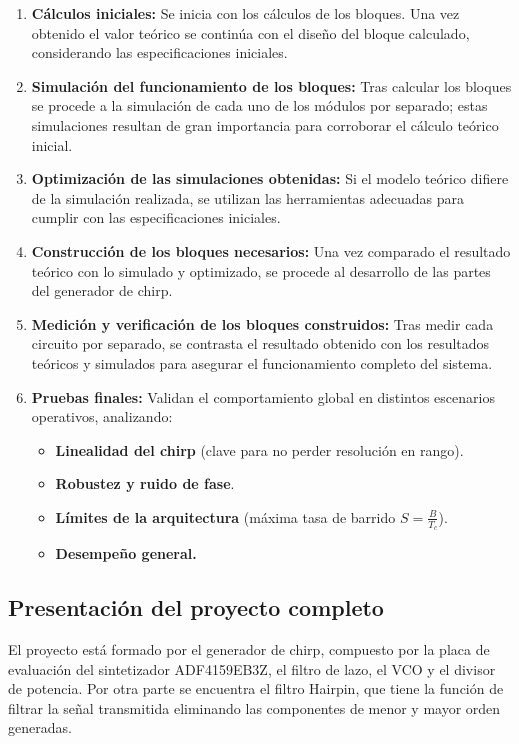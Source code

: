 \begin{enumerate}
    \item \textbf{Cálculos iniciales:} Se inicia con los cálculos de los bloques. Una vez obtenido el valor teórico se continúa con el diseño del bloque calculado, considerando las especificaciones iniciales.
    
    \item \textbf{Simulación del funcionamiento de los bloques:} Tras calcular los bloques se procede a la simulación de cada uno de los módulos por separado; estas simulaciones resultan de gran importancia para corroborar el cálculo teórico inicial.
    
    \item \textbf{Optimización de las simulaciones obtenidas:} Si el modelo teórico difiere de la simulación realizada, se utilizan las herramientas adecuadas para cumplir con las especificaciones iniciales.

    \item \textbf{Construcción de los bloques necesarios:} Una vez comparado el resultado teórico con lo simulado y optimizado, se procede al desarrollo de las partes del generador de chirp.

    \item \textbf{Medición y verificación de los bloques construidos:} Tras medir cada circuito por separado, se contrasta el resultado obtenido con los resultados teóricos y simulados para asegurar el funcionamiento completo del sistema.
       
    \item \textbf{Pruebas finales:} Validan el comportamiento global en distintos escenarios operativos, analizando:
    \begin{itemize}
        \item \textbf{Linealidad del chirp} (clave para no perder resolución en rango).
        \item \textbf{Robustez y ruido de fase}.
        \item \textbf{Límites de la arquitectura} (máxima tasa de barrido $S = \frac{B}{T_c}$).
        \item \textbf{Desempeño general.}
    \end{itemize}
\end{enumerate}

\subsection{Presentación del proyecto completo}
El proyecto está formado por el generador de chirp, compuesto por la placa de evaluación del sintetizador ADF4159EB3Z, el filtro de lazo, el VCO y el divisor de potencia. Por otra parte se encuentra el filtro Hairpin, que tiene la función de filtrar la señal transmitida eliminando las componentes de menor y mayor orden generadas.

